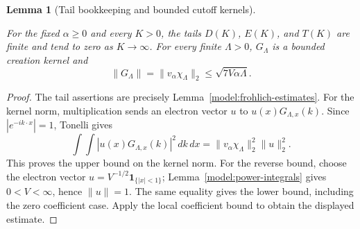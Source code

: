 \documentclass[11pt,a4paper]{article}
\newtheorem{lemma}[theorem]{Lemma}
\theoremstyle{definition}
\theoremstyle{remark}
\newcommand{\proofid}[1]{\par\smallskip{\normalfont\scriptsize\color{inkblue}Stable ID: \nolinkurl{#1}}\par\smallskip}
\begin{document}
\begin{lemma}[Tail bookkeeping and bounded cutoff kernels]
\label{main:tails}
\proofid{main:tails}
\par{}\par\smallskip

For the fixed $\alpha\geq0$ and every $K>0$, the tails $D(K)$, $E(K)$,
and $T(K)$ are finite and tend to zero as $K\to\infty$.
For every finite $\Lambda>0$, $G_\Lambda$ is a bounded creation kernel
and
\[
 \|G_\Lambda\|=\|v_\alpha\chi_\Lambda\|_2
       \leq\sqrt{7V\alpha\Lambda}.
\]
\end{lemma}
\begin{proof}
The tail assertions are precisely Lemma~\ref{model:frohlich-estimates}.
For the kernel norm, multiplication sends an electron vector $u$ to
$u(x)G_{\Lambda,x}(k)$. Since $|e^{-ik\cdot x}|=1$, Tonelli gives
\[
 \int\!\int |u(x)G_{\Lambda,x}(k)|^2\,dk\,dx
 =\|v_\alpha\chi_\Lambda\|_2^2\|u\|_2^2.
\]
This proves the upper bound on the kernel norm. For the reverse
bound, choose the electron vector $u=V^{-1/2}\mathbf1_{\{|x|<1\}}$;
Lemma~\ref{model:power-integrals} gives $0<V<\infty$, hence
$\|u\|=1$. The same equality gives the lower bound, including the
zero coefficient case. Apply the local coefficient bound to obtain
the displayed estimate.
\end{proof}
\end{document}
